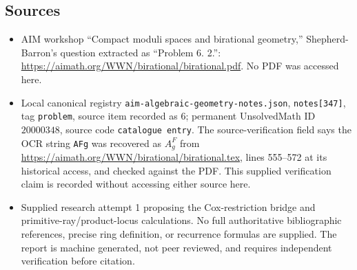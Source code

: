 \documentclass[11pt]{article}
\begin{document}
\subsection{Sources}
\begin{itemize}
\item AIM workshop ``Compact moduli spaces and birational geometry,'' Shepherd-Barron's question extracted as ``Problem 6. 2.'': \url{https://aimath.org/WWN/birational/birational.pdf}. No PDF was accessed here.
\item Local canonical registry \texttt{aim-algebraic-geometry-notes.json}, \texttt{notes[347]}, tag \texttt{problem}, source item recorded as 6; permanent UnsolvedMath ID \(20000348\), source code \texttt{catalogue entry}. The source-verification field says the OCR string \texttt{AFg} was recovered as \(A_g^F\) from \url{https://aimath.org/WWN/birational/birational.tex}, lines 555--572 at its historical access, and checked against the PDF. This supplied verification claim is recorded without accessing either source here.
\item Supplied research attempt 1 proposing the Cox-restriction bridge and primitive-ray/product-locus calculations. No full authoritative bibliographic references, precise ring definition, or recurrence formulas are supplied. The report is machine generated, not peer reviewed, and requires independent verification before citation.
\end{itemize}
\end{document}
